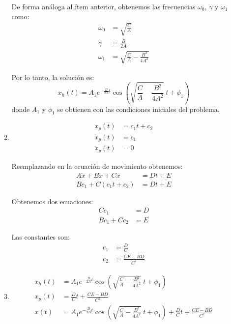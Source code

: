 \begin{enumerate}[a)]
\begin{enumerate}
		De forma análoga al ítem anterior, obtenemos las frecuencias $\omega_0$, $\gamma$ y $\omega_1$ como:
		\begin{align*}
			\omega_0 &= \sqrt{\frac{C}{A}} \\
			\gamma &= \frac{B}{2A} \\
			\omega_1 &= \sqrt{ \frac{C}{A} - \frac{B^2}{4A^2}}
		\end{align*}
		
		Por lo tanto, la solución es:
		\begin{equation*}
			x_h(t) = A_1 e^{-\frac{B}{2A} t} \cos \left( \sqrt{ \frac{C}{A} - \frac{B^2}{4A^2}} \ t + \phi_1 \right)
		\end{equation*}
		donde $A_1$ y $\phi_1$ se obtienen con las condiciones iniciales del problema.
		
		\item 
		\begin{align*}
			x_p(t) &= c_1 t + c_2 \\
			\dot{x}_p(t) &= c_1 \\
			\ddot{x}_p(t) &= 0
		\end{align*}
		
		Reemplazando en la ecuación de movimiento obtenemos:
		\begin{align*}
			A \ddot{x} + B \dot{x} + Cx &= Dt + E \\
			B c_1 + C \left( c_1 t + c_2 \right) &= Dt + E
		\end{align*}
		
		Obtenemos dos ecuaciones:
		\begin{align*}
			C c_1 &= D \\
			B c_1 + C c_2 &= E
		\end{align*}
		
		Las constantes son:
		\begin{align*}
			c_1 &= \frac{D}{C} \\
			c_2 &= \frac{CE-BD}{C^2}
		\end{align*}
	
		\item
		\begin{align*}
			x_h(t) &= A_1 e^{-\frac{B}{2A} t} \cos \left( \sqrt{ \frac{C}{A} - \frac{B^2}{4A^2}} \ t + \phi_1 \right) \\
			x_p(t) &= \frac{D}{C}t + \frac{CE-BD}{C^2} \\
			x(t) &= A_1 e^{-\frac{B}{2A} t} \cos \left( \sqrt{ \frac{C}{A} - \frac{B^2}{4A^2}} \ t + \phi_1 \right) + \frac{D}{C}t + \frac{CE-BD}{C^2}
		\end{align*}
		

\end{enumerate}
\end{enumerate}
